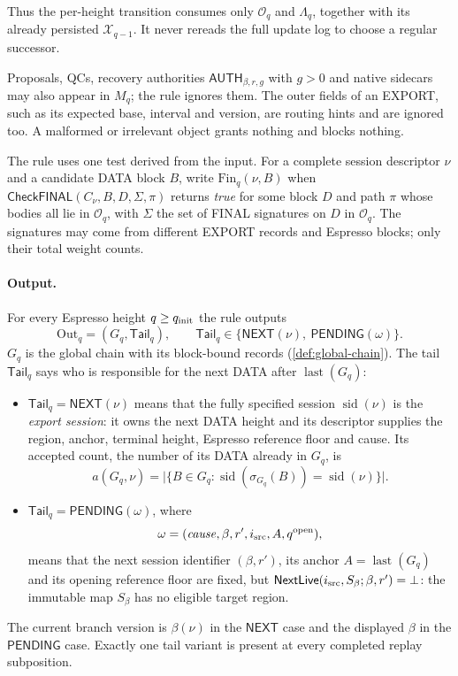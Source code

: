 \documentclass[11pt,a4paper]{article}
\newcommand{\tagg}[1]{\ensuremath{\mathsf{#1}}}
\newcommand{\defterm}[1]{\textcolor{rrBlue}{\textit{#1}}}
\begin{document}
Thus the per-height transition consumes only $\mathcal O_q$ and
$\Lambda_q$, together with its already persisted $\mathcal X_{q-1}$.
It never rereads the full update log to choose a regular successor.

Proposals, QCs, recovery authorities
$\tagg{AUTH}_{\beta,r,g}$ with $g>0$ and native sidecars may also appear in
$M_q$; the rule ignores them. The outer fields of an EXPORT, such as its
expected base, interval and version, are routing hints and are ignored
too. A malformed or irrelevant object grants nothing and blocks nothing.

The rule uses one test derived from the input. For a complete session
descriptor $\nu$ and a candidate DATA block $B$, write
$\mathrm{Fin}_q(\nu,B)$ when
$\tagg{CheckFINAL}(C_\nu,B,D,\Sigma,\pi)$ returns \emph{true} for
some block $D$ and path $\pi$ whose bodies all lie in $\mathcal O_q$, with
$\Sigma$ the set of FINAL signatures on $D$ in $\mathcal O_q$. The
signatures may come from different EXPORT records and Espresso blocks;
only their total weight counts.

\paragraph{Output.}
For every Espresso height $q\ge q_{\rm init}$ the rule outputs
\[
 \boxed{\mathrm{Out}_q=(G_q,\mathsf{Tail}_q)},\qquad
 \mathsf{Tail}_q\in\{\tagg{NEXT}(\nu),\ \tagg{PENDING}(\omega)\}.
\]
$G_q$ is the global chain with its block-bound records
(\cref{def:global-chain}).  The tail $\mathsf{Tail}_q$ says who is responsible for
the next DATA after $\operatorname{last}(G_q)$:
\begin{itemize}[itemsep=2pt]
\item $\mathsf{Tail}_q=\tagg{NEXT}(\nu)$ means that the fully specified session
$\operatorname{sid}(\nu)$ is the \defterm{export session}: it owns the
next DATA height and its descriptor supplies the region, anchor,
terminal height, Espresso reference floor and cause. Its accepted
count, the number of its DATA already in $G_q$, is
\[
 a(G_q,\nu)=
 \bigl|\{B\in G_q:\operatorname{sid}(\sigma_{G_q}(B))
                 =\operatorname{sid}(\nu)\}\bigr|.
 \]
\item $\mathsf{Tail}_q=\tagg{PENDING}(\omega)$, where
\[
 \omega=(\mathit{cause},\beta,r',i_{\rm src},A,q^{\rm open}),
\]
means that the next session identifier $(\beta,r')$, its anchor
$A=\operatorname{last}(G_q)$ and its opening reference floor are fixed,
but $\tagg{NextLive}(i_{\rm src},S_\beta;\beta,r')=\bot$: the immutable map
$S_\beta$ has no eligible target region.
\end{itemize}
The current branch version is $\beta(\nu)$ in the \tagg{NEXT} case and
the displayed $\beta$ in the \tagg{PENDING} case.  Exactly one tail
variant is present at every completed replay subposition.
\end{document}
